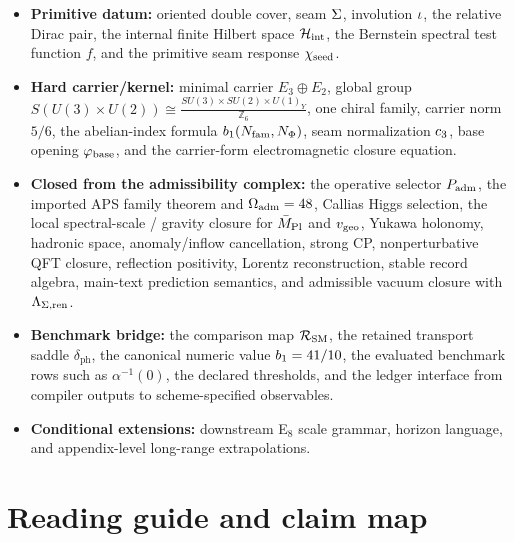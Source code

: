 \begin{tcolorbox}[colback=gray!5, colframe=gray!60, breakable,
    title={\textbf{Reading Status for the Present Paper}}, fonttitle=\bfseries]
\begin{itemize}[leftmargin=1.5em, topsep=3pt, itemsep=3pt]
    \item \textbf{Primitive datum:} oriented double cover, seam $\Sigma$, involution $\iota$, the relative Dirac pair, the internal finite Hilbert space $\mathcal H_{\mathrm{int}}$, the Bernstein spectral test function $f$, and the primitive seam response $\chi_{\mathrm{seed}}$.
    \item \textbf{Hard carrier/kernel:} minimal carrier $E_3\oplus E_2$, global group $S(U(3)\times U(2))\cong \frac{SU(3)\times SU(2)\times U(1)_Y}{\mathbb Z_6}$, one chiral family, carrier norm $5/6$, the abelian-index formula $b_1(N_{\mathrm{fam}},N_\Phi)$, seam normalization $c_3$, base opening $\varphi_{\mathrm{base}}$, and the carrier-form electromagnetic closure equation.
    \item \textbf{Closed from the admissibility complex:} the operative selector $P_{\mathrm{adm}}$, the imported APS family theorem and $\Omega_{\mathrm{adm}}=48$, Callias Higgs selection, the local spectral-scale / gravity closure for $\bar M_{\mathrm{Pl}}$ and $v_{\mathrm{geo}}$, Yukawa holonomy, hadronic space, anomaly/inflow cancellation, strong CP, nonperturbative QFT closure, reflection positivity, Lorentz reconstruction, stable record algebra, main-text prediction semantics, and admissible vacuum closure with $\Lambda_{\Sigma,\mathrm{ren}}$.
    \item \textbf{Benchmark bridge:} the comparison map $\mathcal R_{\mathrm{SM}}$, the retained transport saddle $\delta_{\mathrm{ph}}$, the canonical numeric value $b_1=41/10$, the evaluated benchmark rows such as $\alpha^{-1}(0)$, the declared thresholds, and the ledger interface from compiler outputs to scheme-specified observables.
    \item \textbf{Conditional extensions:} downstream E$_8$ scale grammar, horizon language, and appendix-level long-range extrapolations.
\end{itemize}
\end{tcolorbox}

\tableofcontents

\section{Reading guide and claim map}

